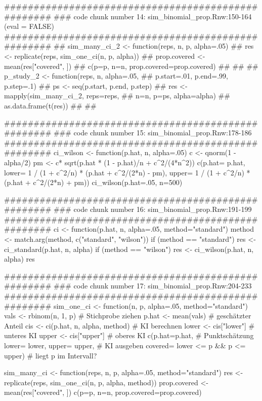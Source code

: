 ###################################################
### code chunk number 14: sim_binomial_prop.Rnw:150-164 (eval = FALSE)
###################################################
## sim_many_ci_2 <- function(reps, n, p, alpha=.05){
##   res <- replicate(reps, sim_one_ci(n, p, alpha))
##   prop.covered <- mean(res["covered", ])
##   c(p=p, n=n, prop.covered=prop.covered)                   
## } 
## 
## p_study_2 <- function(reps, n, alpha=.05,
##                       p.start=.01, p.end=.99, p.step=.1){
##   ps <- seq(p.start, p.end, p.step)                     
##   res <- mapply(sim_many_ci_2, reps=reps,
##                 n=n, p=ps, alpha=alpha)   
##   as.data.frame(t(res))
## }   
## 


###################################################
### code chunk number 15: sim_binomial_prop.Rnw:178-186
###################################################
ci_wilson <- function(p.hat, n, alpha=.05){
  c <- qnorm(1 - alpha/2)
  pm <- c* sqrt(p.hat * (1 - p.hat)/n + c^2/(4*n^2))   
  c(p.hat= p.hat,
    lower= 1 / (1 + c^2/n) * (p.hat + c^2/(2*n) - pm),
    upper= 1 / (1 + c^2/n) * (p.hat + c^2/(2*n) + pm))
} 
ci_wilson(p.hat=.05, n=500)


###################################################
### code chunk number 16: sim_binomial_prop.Rnw:191-199
###################################################
ci <- function(p.hat, n, alpha=.05, method="standard"){
  method <- match.arg(method, c("standard", "wilson"))  
  if (method == "standard")
    res <- ci_standard(p.hat, n, alpha)
  if (method == "wilson")       
    res <- ci_wilson(p.hat, n, alpha)
  res
}   


###################################################
### code chunk number 17: sim_binomial_prop.Rnw:204-233
###################################################
sim_one_ci <- function(n, p, alpha=.05, 
                        method="standard"){
  vals <- rbinom(n, 1, p)                # Stichprobe ziehen 
  p.hat <- mean(vals)                    # geschätzter Anteil 
  cis <- ci(p.hat, n, alpha, method)     # KI berechnen
  lower <- cis["lower"]                  # unteres KI
  upper <- cis["upper"]                  # oberes KI  
  c(p.hat=p.hat,                         # Punktschätzung
    lower= lower, upper= upper,          # KI ausgeben   
    covered= lower <= p && p <= upper)   # liegt p im Intervall?
}

sim_many_ci <- function(reps, n, p, alpha=.05,
                          method="standard"){
  res <- replicate(reps, sim_one_ci(n, p, alpha, method))
  prop.covered <- mean(res["covered", ])
  c(p=p, n=n, prop.covered=prop.covered)                   
} 

